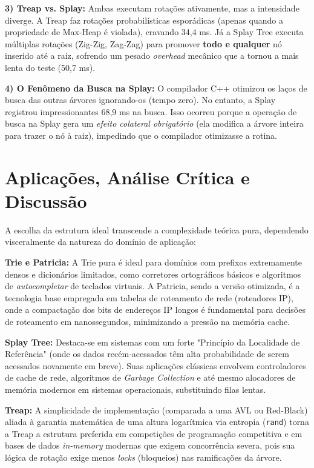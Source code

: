 \documentclass[conference]{IEEEtran}
\begin{document}
\textbf{3) Treap vs. Splay:} Ambas executam rotações ativamente, mas a intensidade diverge. A Treap faz rotações probabilísticas esporádicas (apenas quando a propriedade de Max-Heap é violada), cravando 34,4 ms. Já a Splay Tree executa múltiplas rotações (Zig-Zig, Zag-Zag) para promover \textbf{todo e qualquer} nó inserido até a raiz, sofrendo um pesado \textit{overhead} mecânico que a tornou a mais lenta do teste (50,7 ms). 

\textbf{4) O Fenômeno da Busca na Splay:} O compilador C++ otimizou os laços de busca das outras árvores ignorando-os (tempo zero). No entanto, a Splay registrou impressionantes 68,9 ms na busca. Isso ocorreu porque a operação de busca na Splay gera um \textit{efeito colateral obrigatório} (ela modifica a árvore inteira para trazer o nó à raiz), impedindo que o compilador otimizasse a rotina.

\section{Aplicações, Análise Crítica e Discussão}

A escolha da estrutura ideal transcende a complexidade teórica pura, dependendo visceralmente da natureza do domínio de aplicação:

\textbf{Trie e Patricia:} A Trie pura é ideal para domínios com prefixos extremamente densos e dicionários limitados, como corretores ortográficos básicos e algoritmos de \textit{autocompletar} de teclados virtuais. A Patricia, sendo a versão otimizada, é a tecnologia base empregada em tabelas de roteamento de rede (roteadores IP), onde a compactação dos bits de endereços IP longos é fundamental para decisões de roteamento em nanossegundos, minimizando a pressão na memória cache.

\textbf{Splay Tree:} Destaca-se em sistemas com um forte "Princípio da Localidade de Referência" (onde os dados recém-acessados têm alta probabilidade de serem acessados novamente em breve). Suas aplicações clássicas envolvem controladores de cache de rede, algoritmos de \textit{Garbage Collection} e até mesmo alocadores de memória modernos em sistemas operacionais, substituindo filas lentas.

\textbf{Treap:} A simplicidade de implementação (comparada a uma AVL ou Red-Black) aliada à garantia matemática de uma altura logarítmica via entropia (\texttt{rand}) torna a Treap a estrutura preferida em competições de programação competitiva e em bases de dados \textit{in-memory} modernas que exigem concorrência severa, pois sua lógica de rotação exige menos \textit{locks} (bloqueios) nas ramificações da árvore.
\end{document}
